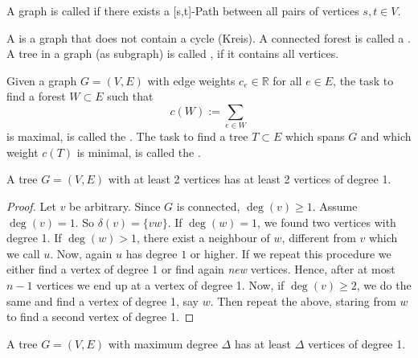 \setcounter{lecture}{1}
\setcounter{section}{2}
\begin{lec}[2011-10-13]\end{lec}


\begin{defn}[connected]
A graph is called  if there exists a [s,t]-Path between all pairs of vertices $s,t \in V$.
\end{defn}

\begin{defn}
A  is a graph that does not contain a cycle (Kreis). A connected forest is called a
. A tree in a graph (as subgraph) is called
, if it contains all vertices.

Given a graph $G=(V,E)$ with edge weights $c_e \in \mathbb{R}$ for all $e \in E$, the task to find a forest $W \subset E$ such that \[c(W):=\sum\limits_{e\in W} \] is maximal, is called the
. 
The task to find a tree $T\subset E$ which spans $G$ and which weight $c(T)$ is minimal, is called the
.
\end{defn}

\begin{lem}
A tree $G=(V,E)$ with at least 2 vertices has at least 2 vertices of degree 1.
\end{lem}
\begin{proof}
Let $v$ be arbitrary. Since $G$ is connected, $\deg(v) \geq 1$. Assume $\deg(v)=1$. So $\delta(v)=\{vw\}$. If $\deg(w)=1$, we found two vertices with degree 1. If $\deg(w)>1$, there exist a neighbour of $w$, different from $v$ which we call $u$. Now, again $u$ has degree $1$ or higher. If we repeat this procedure we either find a vertex of degree 1 or find again \emph{new} vertices. Hence, after at most $n-1$ vertices we end up at a vertex of degree 1. 
Now, if $\deg(v) \geq 2$, we do the same and find a vertex of degree 1, say $w$. Then repeat the above, staring from $w$ to find a second vertex of degree 1.
\end{proof}

\begin{cor}
A tree $G=(V,E)$ with maximum degree $\Delta$ has at least $\Delta$ vertices of degree 1.
\end{cor}

